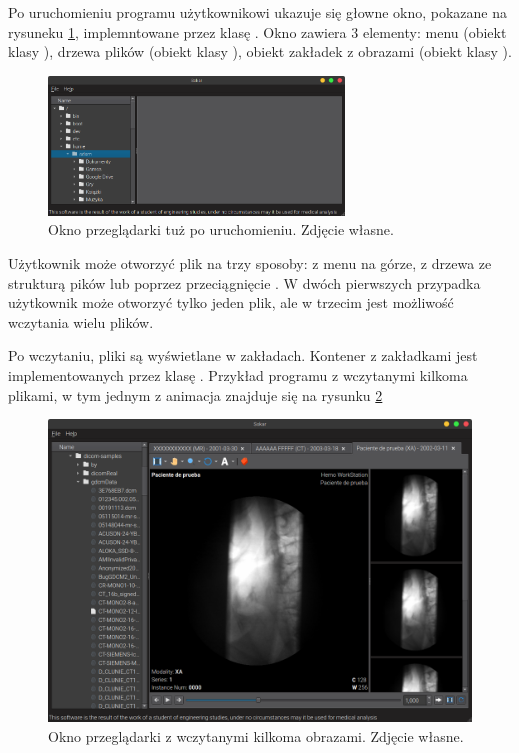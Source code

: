 \label{sec:sokar-gui}

\par
Po uruchomieniu programu użytkownikowi ukazuje się głowne okno, pokazane na rysuneku \ref{fig:sokar-gui-empty-window}, implemntowane przez klasę .
Okno zawiera 3 elementy: menu (obiekt klasy ), drzewa plików (obiekt klasy ), obiekt zakładek z obrazami (obiekt klasy ).

\begin{figure}[!htbp]
    \centering
    \includegraphics[width=0.7\textwidth]{img/sokar-gui-001.png}
    \caption{Okno przeglądarki tuż po uruchomieniu. Zdjęcie własne.}
    \label{fig:sokar-gui-empty-window}
\end{figure}

\par
Użytkownik może otworzyć plik \DICOM na trzy sposoby: z menu na górze, z drzewa ze strukturą pików lub poprzez przeciągnięcie .
W dwóch pierwszych przypadka użytkownik może otworzyć tylko jeden plik, ale w trzecim jest możliwość wczytania wielu plików.

\par
Po wczytaniu, pliki są wyświetlane w zakładach.
Kontener z zakładkami jest implementowanych przez klasę .
Przykład programu z wczytanymi kilkoma plikami, w tym jednym z animacja znajduje się na rysunku \ref{fig:sokar-gui-with-files}

\begin{figure}[!htbp]
    \centering
    \includegraphics[width=\textwidth]{img/sokar-gui-002.png}
    \caption{Okno przeglądarki z wczytanymi kilkoma obrazami. Zdjęcie własne.}
    \label{fig:sokar-gui-with-files}
\end{figure}

